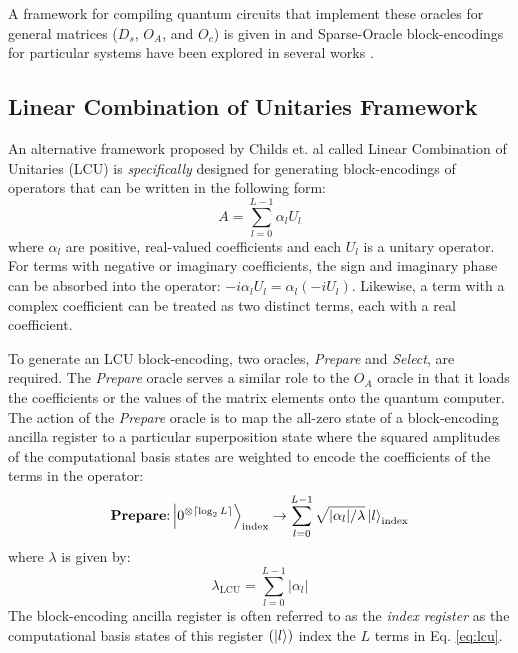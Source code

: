 A framework for compiling quantum circuits that implement these oracles for general matrices ($D_s$, $O_A$, and $O_c$) is given in \cite{camps2024explicit, camps2022fable} and Sparse-Oracle block-encodings for particular systems have been explored in several works \cite{camps2022fable, liu2024efficient, sanavio2024explicit}.

\subsection{Linear Combination of Unitaries Framework}
\label{subsec:lcu}

An alternative framework proposed by Childs et. al \cite{childs2012hamiltonian} called Linear Combination of Unitaries (LCU) is \textit{specifically} designed for generating block-encodings of operators that can be written in the following form:
\begin{equation}
    \label{eq:lcu}
    A = \sum_{l=0}^{L-1} \alpha_l U_l
\end{equation}
where $\alpha_l$ are positive, real-valued coefficients and each $U_l$ is a unitary operator.
For terms with negative or imaginary coefficients, the sign and imaginary phase can be absorbed into the operator: $-i \alpha_l U_l = \alpha_l (-i U_l)$.
Likewise, a term with a complex coefficient can be treated as two distinct terms, each with a real coefficient.

To generate an LCU block-encoding, two oracles, \textit{Prepare} and \textit{Select}, are required. The \textit{Prepare} oracle serves a similar role to the $O_A$ oracle in that it loads the coefficients or the values of the matrix elements onto the quantum computer.
The action of the \textit{Prepare} oracle is to map the all-zero state of a block-encoding ancilla register to a particular superposition state where the squared amplitudes of the computational basis states are weighted to encode the coefficients of the terms in the operator:
\begin{equation}
    \label{eq:prep-state}
    \textbf{Prepare}\text{:} \ket{0^{\otimes \lceil \log_2 L \rceil}}_\text{index} \rightarrow \sum_{l=0}^{L-1} \sqrt{| \alpha_l | / \lambda} \ket{l}_\text{index}
\end{equation}
where $\lambda$ is given by:
\begin{equation}
    \label{eq:lambda-lcu}
    \lambda_\text{LCU} = \sum_{l=0}^{L-1} | \alpha_l |
\end{equation}
The block-encoding ancilla register is often referred to as the \textit{index register} as the computational basis states of this register $(\ket{l})$ index the $L$ terms in Eq. \ref{eq:lcu}.

